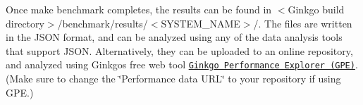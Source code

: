Once {\ttfamily make benchmark} completes, the results can be found in {\ttfamily $<$Ginkgo build directory$>$/benchmark/results/$<$S\+Y\+S\+T\+E\+M\+\_\+\+N\+A\+ME$>$/}. The files are written in the J\+S\+ON format, and can be analyzed using any of the data analysis tools that support J\+S\+ON. Alternatively, they can be uploaded to an online repository, and analyzed using Ginkgo\textquotesingle{}s free web tool \href{https://ginkgo-project.github.io/gpe/}{\tt Ginkgo Performance Explorer (G\+PE)}. (Make sure to change the \char`\"{}\+Performance data U\+R\+L\char`\"{} to your repository if using G\+PE.) 